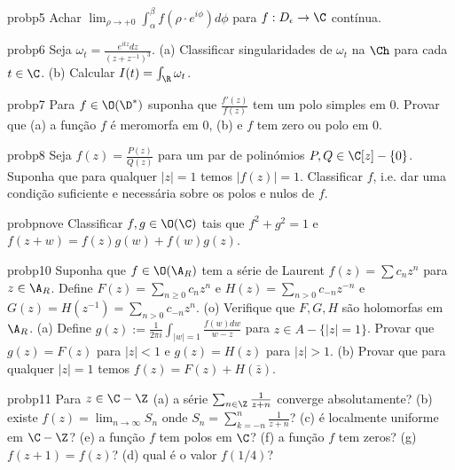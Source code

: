 \begin{restatable}{prob}{p5}\label{p5} %
Achar $\lim_{\rho\to+0} \int_\alpha^\beta f(\rho\cdot e^{i\phi}) d\phi$
para $f : D_\epsilon\to\C$ contínua.
\end{restatable}

\begin{restatable}{prob}{p6}\label{p6} %
Seja $\omega_t = \frac{e^{itz} dz}{(z+z^{-1})^3}$.
(a) Classificar singularidades de $\omega_t$ na $\Ch$
para cada $t\in\C$.
(b) Calcular $I(t) = \int_\R \omega_t$.
\end{restatable}

\begin{restatable}{prob}{p7}\label{p7} %
Para $f\in\O(\D^*)$ %
suponha que $\frac{f'(z)}{f(z)}$
tem um polo simples em $0$. Provar que
(a) a função $f$ é meromorfa em $0$,
(b) e $f$ tem zero ou polo em $0$.
\end{restatable}

\begin{restatable}{prob}{p8}\label{p8} %
Seja $f(z) = \frac{P(z)}{Q(z)}$ para um par de polinómios $P,Q\in\C[z]-\{0\}$.
Suponha que para qualquer $|z|=1$ temos $|f(z)|=1$. Classificar $f$,
i.e. dar uma condição suficiente e necessária sobre os polos e nulos de $f$.
\end{restatable}

\begin{restatable}{prob}{pnove}\label{p9} %
Classificar $f,g\in\O(\C)$ tais que
$f^2+g^2=1$ e $f(z+w) = f(z) g(w) + f(w) g(z)$.
\end{restatable}

\begin{restatable}{prob}{p10}\label{p10} %
Suponha que $f \in \O(\A_R)$ %
tem a série de Laurent $f(z) = \sum c_n z^n$ para $z\in \A_R$.
Define $F(z) = \sum_{n\geq 0} c_n z^n$ e $H(z) = \sum_{n>0} c_{-n} z^{-n}$ e $G(z) = H(z^{-1}) = \sum_{n>0} c_{-n} z^{n}$.
(o) Verifique que $F,G,H$ são holomorfas em $\A_R$.
(a) Define $g(z) := \frac{1}{2\pi i} \int_{|w|=1} \frac{f(w) dw}{w-z}$
para $z\in A - \{|z|=1\}$. Provar que $g(z) = F(z)$ para $|z|<1$ e $g(z)=H(z)$ para $|z|>1$.
(b) Provar que para qualquer $|z|=1$ temos $f(z) = F(z) + H(\bar{z})$.
\end{restatable}

\begin{restatable}{prob}{p11}\label{p11} %
Para $z\in\C-\Z$
(a) a série $\sum_{n\in\Z} \frac{1}{z+n}$ converge absolutamente?
(b) existe $f(z) = \lim_{n\to\infty} S_n$ onde $S_n = \sum_{k=-n}^n \frac{1}{z+n}$?
(c) é localmente uniforme em $\C-\Z$?
(e) a função $f$ tem polos em $\C$?
(f) a função $f$ tem zeros?
(g) $f(z+1) = f(z)$?
(d) qual é o valor $f(1/4)$?
\end{restatable}

